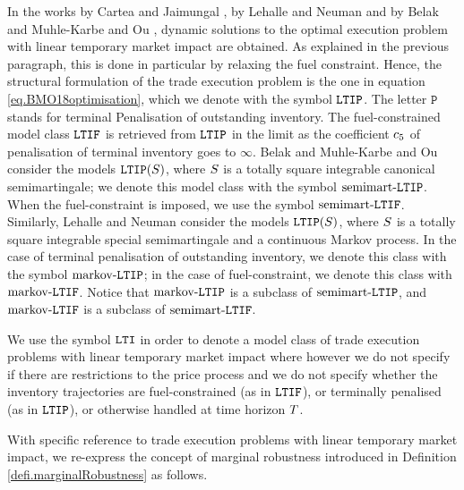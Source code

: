 \documentclass[10pt,a4paper]{article}
\begin{document}
	In the works by Cartea and Jaimungal \cite{CJ16inc}, by Lehalle and Neuman \cite{LN19inc} and by Belak and Muhle-Karbe and Ou \cite{BMO18opt}, dynamic solutions to the optimal execution problem with linear temporary market impact are obtained. As explained in the previous  paragraph, this is done in particular by relaxing the fuel constraint. Hence, the structural formulation of the trade execution problem is the one in equation \eqref{eq.BMO18optimisation}, which we denote with the symbol $\mathtt{LTIP}$. The letter $\mathtt{P}$ stands for terminal Penalisation of outstanding inventory. The fuel-constrained model class $\mathtt{LTIF}$ is retrieved from $\mathtt{LTIP}$ in the limit as the coefficient $c_{5}$ of penalisation of terminal inventory goes to $\infty$.  Belak and Muhle-Karbe and Ou \cite{BMO18opt} consider  the models $\mathtt{LTIP}(S)$, where $S$ is a totally square integrable canonical semimartingale; we denote this model class with the symbol $\text{semimart-}\mathtt{LTIP}$. When the fuel-constraint is imposed, we use the symbol $\text{semimart-}\mathtt{LTIF}$. Similarly,  Lehalle and Neuman \cite{LN19inc} consider  the models $\mathtt{LTIP}(S)$, where $S$ is a totally square integrable special semimartingale and a continuous Markov process. In the case of terminal penalisation of outstanding inventory, we denote this class with the symbol $\text{markov-}\mathtt{LTIP}$; in the case of fuel-constraint, we denote this class with $\text{markov-}\mathtt{LTIF}$.  Notice that $\text{markov-}\mathtt{LTIP}$ is a subclass of $\text{semimart-}\mathtt{LTIP}$, and $\text{markov-}\mathtt{LTIF}$ is a subclass of $\text{semimart-}\mathtt{LTIF}$.
	
	We use the symbol $\mathtt{LTI}$ in order to denote a model class of trade execution problems with linear temporary market impact where however we do not specify if there are restrictions to the price process and we do not specify whether the inventory trajectories are fuel-constrained (as in $\mathtt{LTIF}$), or terminally penalised (as in $\mathtt{LTIP}$), or otherwise handled at  time horizon $T$.
	
	With specific reference to trade execution problems with linear temporary market impact, we re-express the concept of marginal robustness introduced in Definition \ref{defi.marginalRobustness}  as follows.
	
\end{document}
